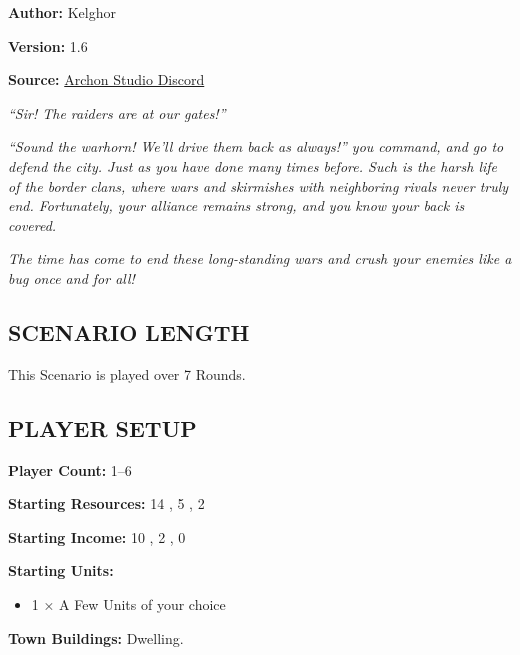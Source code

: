 
\begin{multicols}{2}

\textbf{Author:} Kelghor

\textbf{Version:} 1.6

\textbf{Source:} \href{https://discord.com/channels/740870068178649108/1313651865648369725}{Archon Studio Discord}

\textit{``Sir! The raiders are at our gates!''}

\textit{``Sound the warhorn! We'll drive them back as always!'' you command, and go to defend the city. Just as you have done many times before. Such is the harsh life of the border clans, where wars and skirmishes with neighboring rivals never truly end. Fortunately, your alliance remains strong, and you know your back is covered.}

\textit{The time has come to end these long-standing wars and crush your enemies like a bug once and for all!}

\subsection*{\MakeUppercase{Scenario Length}}

This Scenario is played over 7 Rounds.

\subsection*{\MakeUppercase{Player Setup}}

\textbf{Player Count:} 1--6

\textbf{Starting Resources:} 14 , 5 , 2 

\textbf{Starting Income:} 10 , 2 , 0 

\textbf{Starting Units:}
\begin{itemize}
  \item  1 × A Few  Units of your choice
\end{itemize}

\textbf{Town Buildings:}  Dwelling.


\end{multicols}
